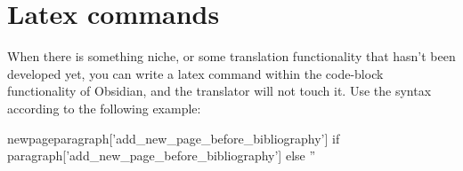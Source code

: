 



\section{Latex commands}

When there is something niche, or some translation functionality that hasn't been developed yet, you can write a latex command within the code-block functionality of Obsidian, and the translator will not touch it. Use the syntax according to the following example:





\lipsum[1-4]




\newpage


\newpage


newpage{{{paragraph['add_new_page_before_bibliography'] if paragraph['add_new_page_before_bibliography'] else ''}}}



